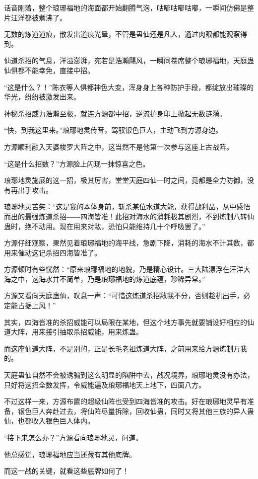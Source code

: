 \begin{this_body}
话音刚落，整个琅琊福地的海面都开始翻腾气泡，咕嘟咕嘟咕嘟，一瞬间仿佛是整片汪洋都被煮沸了。

无数的炼道道痕，散发出道痕光晕，不管是蛊仙还是凡人，通过肉眼都能观察得到。

仙道杀招的气息，洋溢澎湃，宛若是浩瀚飓风，一瞬间卷席整个琅琊福地，天庭蛊仙俱都不能幸免，直接中招。

“这是什么？！”陈衣等人俱都神色大变，浑身身上各种防护手段，都绽放出璀璨的华光，纷纷被激发出来。

神秘杀招威力浩瀚至极，就连方源都中招，逆流护身印上掀起无数涟漪。

“快，到我这里来。”琅琊地灵传音，驾驭银色巨人，主动飞到方源身边。

方源顺利融入天婆梭罗大阵之中，这当然不是他第一次参与这座上古战阵。

“这是什么招数？”方源脸上闪现一抹惊喜之色。

琅琊地灵施展的这一招，极其厉害，堂堂天庭四仙一时之间，竟都是全力防御，没有再出手攻击。

琅琊地灵苦笑：“这是我的本体身前，斩杀某位水道大能，获得战利品，从中感悟而出的最强炼道杀招――四海皆准！此招对海水的消耗极其剧烈，不到炼制八转仙蛊时，绝不动用。现在用来对敌，恐怕只能维持几十个呼吸罢了。”

方源仔细观察，果然见着琅琊福地的海平线，急剧下降，消耗的海水不计其数，都用来催动这记杀招四海皆准了。

方源顿时有些恍然：“原来琅琊福地的地貌，乃是精心设计。三大陆漂浮在汪洋大海之中，这海水并不简单，乃是琅琊福地的炼道底蕴，珍稀异常。”

方源又看向天庭蛊仙，叹息一声：“可惜这炼道杀招敌我不分，否则趁机出手，必定能占据上风！”

其实，四海皆准的杀招威能可以局限在某地，但这个地方事先就要铺设好相应的仙道大阵，用来接引抽取杀招威能，用来炼蛊。

而这座仙道大阵，不是别的，正是长毛老祖炼道大阵，之前用来给方源炼制万我的。

天庭蛊仙自然不会被诱骗到这么明显的陷阱中去，战况境界，琅琊地灵没有办法，只好将这招全数发挥，令威能遍及琅琊福地天上地下，四面八方。

不过这样一来，方源布置的超级仙阵也受到四海皆准的攻击。好在琅琊地灵早有准备，银色巨人奔赴过去，将仙阵尽量拆除，回收仙蛊，同时又将其他三族的异人蛊仙，也都收入银色巨人体内。

“接下来怎么办？”方源看向琅琊地灵，问道。

他总感觉，琅琊福地应当还藏有其他底牌。

而这一战的关键，就看这些底牌如何了！

\end{this_body}

